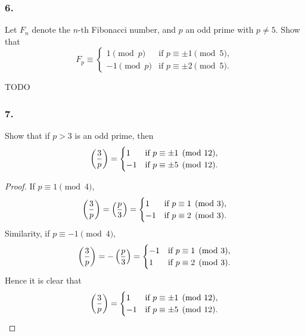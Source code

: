 \subsubsection{6.} Let $F_n$ denote the $n$-th Fibonacci number,
and $p$ an odd prime with $p \neq 5$. Show that
\[
    F_p \equiv \begin{cases}
        1 \pmod{p} & \mbox{if } p \equiv \pm 1 \pmod{5},\\
        -1 \pmod{p} & \mbox{if } p \equiv \pm 2 \pmod{5}.
    \end{cases}
\]

{\Large TODO}

\subsubsection{7.} Show that if $p>3$ is an odd prime, then
\[
    \left(\frac{3}{p}\right) = \begin{cases}
        1 & \mbox{if } p \equiv \pm 1 \pmod{12}, \\
        -1 & \mbox{if }p \equiv \pm 5 \pmod{12}.
    \end{cases}
\]
\begin{proof}
    If $p \equiv 1 \pmod{4}$,
    \[
        \left(\frac{3}{p}\right)=\left(\frac{p}{3}\right)=\begin{cases}
            1 & \mbox{if } p \equiv 1 \pmod{3}, \\
            -1 & \mbox{if } p \equiv 2 \pmod{3}. \\
        \end{cases}
    \]
    Similarity, if $p \equiv -1 \pmod{4}$,
    \[
        \left(\frac{3}{p}\right)=-\left(\frac{p}{3}\right)=\begin{cases}
            -1 & \mbox{if } p \equiv 1 \pmod{3}, \\
            1 & \mbox{if } p \equiv 2 \pmod{3}. \\
        \end{cases}
    \]
    Hence it is clear that
    \[
        \left(\frac{3}{p}\right) = \begin{cases}
            1 & \mbox{if } p \equiv \pm 1 \pmod{12}, \\
            -1 & \mbox{if }p \equiv \pm 5 \pmod{12}.
        \end{cases}
    \]
\end{proof}

